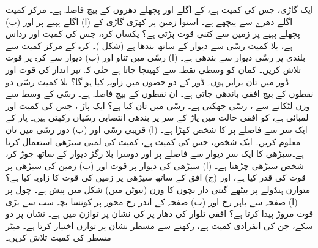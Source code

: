 ایک گاڑی، جس کی کمیت  ہے، کے اگلے اور پچھلے  دھروں کے بیچ  فاصلہ ہے۔ مرکز کمیت اگلے دھرے سے  پیچھے ہے۔ استوا زمین پر کھڑی گاڑی کے  (ا)  اگلے پہیے پر   اور (ب) پچھلے پہیے پر زمین سے کتنی قوت  پڑتی ہے؟
یکساں کرہ، جس کی کمیت  اور رداس  ہے، بلا کمیت رسّی سے دیوار کے ساتھ بندھا ہے (شکل )۔  کرہ کے مرکز کمیت سے  بلندی  پر رسّی دیوار سے بندھی ہے۔ (ا) رسّی  میں تناو اور (ب) دیوار سے کرہ پر قوت  تلاش کریں۔
کمان  کو وسطی نقطہ سے کھینچا جاتا ہے حتٰی  کہ  تیر انداز  کی قوت اور  ڈور میں تان برابر ہوں۔ ڈور کے دو حصوں میں  زاویہ کیا ہو گا؟
بلا کمیت رسّی    دو  نقطوں کے بیچ افقی باندھی جاتی ہے۔ ان نقطوں کے بیچ فاصلہ  ہے۔ رسّی کے وسط سے  وزن لٹکانے سے ، رسّی    جھکتی ہے۔ رسّی میں تان کیا ہے؟
ایک پاڑ ، جس کی کمیت   اور لمبائی  ہے، کو  افقی حالت میں  پاڑ کے سر پر بندھی انتصابی رسّیاں  رکھتی ہیں۔ پار کے ایک سر سے  فاصلے پر  کا شخص کھڑا ہے۔ (ا) قریبی رسّی اور (ب) دور رسّی میں تان معلوم کریں۔
ایک شخص، جس کی کمیت  ہے،  کمیت کی  لمبی سیڑھی استعمال کرتا ہے۔سیڑھی کا ایک سر دیوار سے  فاصلے پر اور دوسرا   بلا رگڑ دیوار کے ساتھ جوڑ کر، شخص سیڑھی چڑھتا ہے۔ (ا) سیڑھی کی  دیوار پر قوت اور (ب)   زمین کی سیڑھی پر قوت کی قدر کیا ہے، اور (ج) افق کے ساتھ  سیڑھی پر زمین کی  قوت کا زاویہ کیا ہے؟
متوازن ہنڈولے پر  بیٹھے گنتی دار   بچوں کا وزن (نیوٹن میں)  شکل  میں پیش ہے۔ چول   پر  (ا) صفحہ سے باہر رخ اور (ب) صفحہ کے اندر رخ محور پر کونسا بچہ سب سے بڑی قوت مروڑ پیدا کرتا ہے؟
افقی  تلوار کی دھار پر    کی نشان پر  توازن میں ہے۔  نشان پر  دو سکے، جن کی انفرادی کمیت      ہے، رکھنے سے   مسطر  نشان پر توازن اختیار کرتا ہے۔ میٹر مسطر کی کمیت تلاش کریں۔
